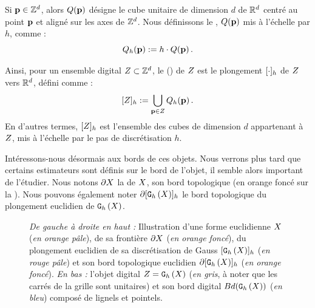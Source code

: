 Si $\mathbf{p} \in \mathbb{Z}^d$, alors $Q({\mathbf{p}})$ désigne le cube unitaire de dimension $d$ de
$\mathbb{R}^d$ centré au point $\mathbf{p}$ et aligné sur les axes de $\mathbb{Z}^d$. Nous définissons
le , \cad $Q({\mathbf{p}})$ mis à l'échelle par $h$, comme :
%
\begin{equation}
  Q_{h}({\mathbf{p}}) := h\cdot Q({\mathbf{p}}) \,.
\end{equation}


Ainsi, pour un ensemble digital $Z \subset \mathbb{Z}^d$, le
 () de $Z$ est le
plongement $\lbrack \cdot \rbrack_{h}$ de $Z$ vers $\mathbb{R}^d$, défini comme :
%
\begin{equation}
  \lbrack Z \rbrack_{h} := \bigcup_{\mathbf{p} \in Z} Q_{h}({\mathbf{p}}) \,.
\end{equation}
%
En d'autres termes, $\lbrack Z \rbrack_{h}$ est l'ensemble des cubes de dimension
$d$ appartenant à $Z$, mis à l'échelle par le pas de discrétisation $h$.


Intéressons-nous désormais aux bords de ces objets. Nous verrons plus tard que
certains estimateurs sont définis sur le bord de l'objet, il semble alors
important de l'étudier. Nous notons $\partial X$ la  de $X$,
\cad son bord topologique (en orange foncé sur la ).
Nous pouvons également noter $\partial \lbrack \mathtt{G}_{h}\left(X\right) \rbrack_{h}$ le bord topologique du
plongement euclidien de $\mathtt{G}_{h}\left(X\right)$.
%
%


\begin{figure}[ht]
  \begin{center}
    
  \end{center}
  \caption{\emph{De gauche à droite en haut :} Illustration d'une forme
  euclidienne $X$ (\emph{en orange pâle}), de sa frontière $\partial X$ (\emph{en
  orange foncé}), du plongement euclidien de sa discrétisation de Gauss
  $\lbrack \mathtt{G}_{h}\left(X\right) \rbrack_{h}$ (\emph{en rouge pâle}) et son bord topologique euclidien
  $\partial\lbrack \mathtt{G}_{h}\left(X\right) \rbrack_{h}$ (\emph{en orange foncé}). \emph{En bas :} l'objet
  digital $Z = \mathtt{G}_{h}\left(X\right)$ (\emph{en gris}, à noter que les carrés de la
  grille sont unitaires) et son bord digital $Bd(\mathtt{G}_{h}\left(X\right))$ (\emph{en
  bleu}) composé de lignels et pointels. \label{fig:frontier}}
\end{figure}


